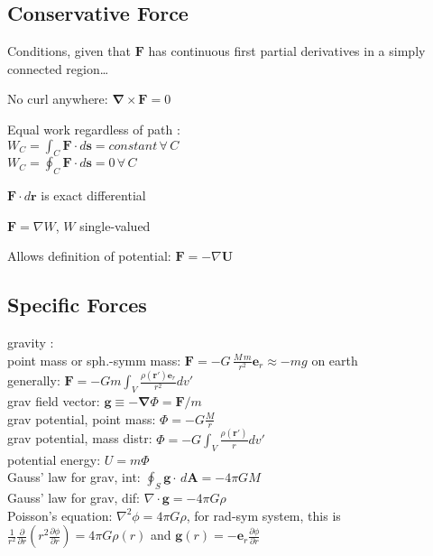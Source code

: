 \documentclass[letterpaper,landscape,10pt]{article}
\newenvironment{mydescription}
{\begin{description}
	\setlength{\itemsep}{0pt}
	\setlength{\parskip}{0pt}
	\setlength{\parsep}{-1pt}}
{\end{description}}
\begin{document}
{\begin{multicols}{3}
	\subsection*{Conservative Force}
	Conditions, given that $\mathbf{F}$ has continuous first partial derivatives
	in a simply connected region\dots
		\begin{mydescription}
			\item[No curl anywhere:]
				$\mathbf{\nabla}\times\mathbf{F}=0$
			\item[Equal work regardless of path]: \\
				$W_C = \int_{C}\mathbf{F} \cdot d\mathbf{s} = constant \,\forall\,C$\\
				$W_C = \oint_{C}\mathbf{F} \cdot d\mathbf{s} = 0 \,\forall\,C$
			\item[$\mathbf{F} \cdot d\mathbf{r}$ is exact differential]
			\item[$\mathbf{F} = \nabla W$, $W$ single-valued]
			\item[Allows definition of potential:]
			  $\mathbf{F} = - \nabla \mathbf{U}$
		\end{mydescription}
	\subsection*{Specific Forces}
		\begin{mydescription}
			\item[gravity]: \\
				point mass or sph.-symm mass: $\mathbf{F} =
					-G \, {\frac{ M \, m}{r^2}}\mathbf{e}_r \approx -mg$
				on earth \\
				generally: $\mathbf{F} = -Gm \int_V
					\frac{\rho(\mathbf{r}')\mathbf{e}_r}{r^2}dv'$ \\
				grav field vector: $\mathbf{g} \equiv - \mathbf{\nabla} \Phi
					= \mathbf{F}/m$ \\
				grav potential, point mass: $\Phi = -G\frac{M}{r}$\\
				grav potential, mass distr: $\Phi = -G\int_V
					\frac{\rho(\mathbf{r}')}{r}dv'$\\
				potential energy: $U = m \Phi$\\
				Gauss' law for grav, int:
					$\oint_S \mathbf{g}\cdot \, d\mathbf{A} = -4\pi GM$\\
				Gauss' law for grav, dif: $\nabla\cdot\mathbf{g}=-4\pi G\rho$\\
				Poisson's equation: $\nabla^2\phi = 4\pi G\rho$, for rad-sym
				system, this is $\frac{1}{r^2}\frac{\partial}{\partial
				r}\left(r^2\frac{\partial\phi}{\partial r}\right) = 4\pi G
				\rho(r)$ and $\mathbf{g}(r)=-\mathbf{e}_r
				\frac{\partial\phi}{\partial r}$


\end{mydescription}
\end{multicols}}
\end{document}

